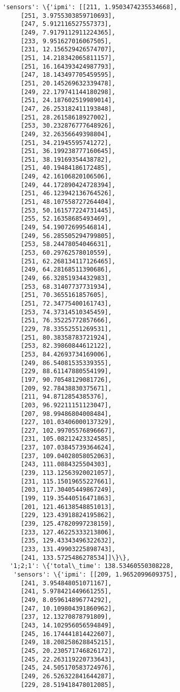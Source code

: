 \documentclass[11pt]{article}
\begin{document}
\begin{tcolorbox}[breakable, size=fbox, boxrule=.5pt, pad at break*=1mm, opacityfill=0]
\begin{Verbatim}[commandchars=\\\{\}]
   'sensors': \{'ipmi': [[211, 1.9503474235534668],
     [251, 3.9755303859710693],
     [247, 5.912116527557373],
     [249, 7.9179112911224365],
     [233, 9.951627016067505],
     [231, 12.156529426574707],
     [251, 14.218342065811157],
     [251, 16.164393424987793],
     [247, 18.143497705459595],
     [251, 20.145269632339478],
     [249, 22.179741144180298],
     [251, 24.187602519989014],
     [247, 26.253182411193848],
     [251, 28.26158618927002],
     [253, 30.232876777648926],
     [249, 32.26356649398804],
     [251, 34.21945595741272],
     [251, 36.199238777160645],
     [251, 38.19169354438782],
     [251, 40.19484186172485],
     [249, 42.16106820106506],
     [249, 44.172890424728394],
     [251, 46.123942136764526],
     [251, 48.107558727264404],
     [253, 50.161577224731445],
     [255, 52.16358685493469],
     [249, 54.19072699546814],
     [249, 56.285505294799805],
     [253, 58.24478054046631],
     [253, 60.29762578010559],
     [251, 62.268134117126465],
     [249, 64.28168511390686],
     [249, 66.32851934432983],
     [253, 68.31407737731934],
     [251, 70.3655161857605],
     [251, 72.34775400161743],
     [253, 74.37314510345459],
     [251, 76.35225772857666],
     [229, 78.33552551269531],
     [251, 80.38358783721924],
     [253, 82.39860844612122],
     [253, 84.42693734169006],
     [249, 86.54081535339355],
     [229, 88.61147880554199],
     [197, 90.70548129081726],
     [209, 92.78438830375671],
     [211, 94.8712854385376],
     [203, 96.92211151123047],
     [207, 98.99486804008484],
     [227, 101.03406000137329],
     [227, 102.99705576896667],
     [231, 105.08212423324585],
     [237, 107.03845739364624],
     [237, 109.04028058052063],
     [243, 111.0884325504303],
     [239, 113.12563920021057],
     [231, 115.15019655227661],
     [203, 117.30405449867249],
     [199, 119.35440516471863],
     [201, 121.46138548851013],
     [229, 123.43918824195862],
     [239, 125.47820997238159],
     [233, 127.46225333213806],
     [235, 129.43343496322632],
     [233, 131.49903225898743],
     [241, 133.5725486278534]]\}\},
  '1;2;1': \{'total\_time': 138.53460550308228,
   'sensors': \{'ipmi': [[209, 1.9652099609375],
     [241, 3.954848051071167],
     [241, 5.978421449661255],
     [249, 8.059614896774292],
     [247, 10.109804391860962],
     [237, 12.13270878791809],
     [243, 14.102956056594849],
     [245, 16.174441814422607],
     [249, 18.208258628845215],
     [245, 20.230571746826172],
     [245, 22.263119220733643],
     [245, 24.505170583724976],
     [249, 26.526322841644287],
     [229, 28.519418478012085],

\end{Verbatim}
\end{tcolorbox}
\end{document}
